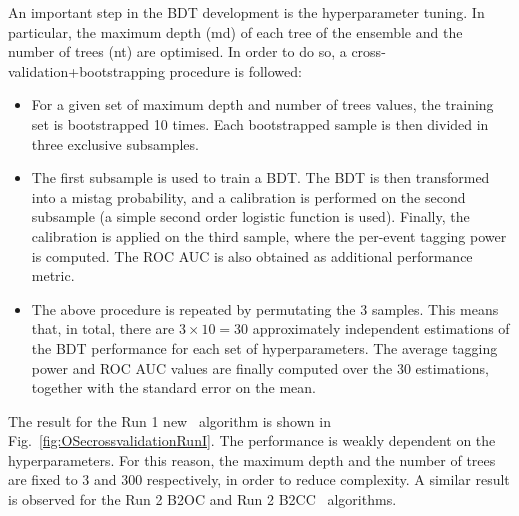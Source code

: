 An important step in the BDT development is the hyperparameter tuning. In particular, the maximum depth (md) of each tree of the ensemble and the number of trees (nt) are optimised. In order to do so, a cross-validation+bootstrapping procedure is followed:
\begin{itemize}[noitemsep,topsep=0pt]
  \item For a given set of maximum depth and number of trees values, the training set is bootstrapped 10 times. Each bootstrapped sample is then divided in three exclusive subsamples.
  \item The first subsample is used to train a BDT. The BDT is then transformed into a mistag probability, and a calibration is performed on the second subsample (a simple second order logistic function is used). Finally, the calibration is applied on the third sample, where the per-event tagging power is computed. The ROC AUC is also obtained as additional performance metric.
  \item The above procedure is repeated by permutating the 3 samples. This means that, in total, there are $3\times10=30$ approximately independent estimations of the BDT performance for each set of hyperparameters. The average tagging power and ROC AUC values are finally computed over the 30 estimations, together with the standard error on the mean.   
\end{itemize}
The result for the Run 1 new \OSe~algorithm is shown in Fig.~\ref{fig:OSecrossvalidationRunI}. The performance is weakly dependent on the hyperparameters. For this reason, the maximum depth and the number of trees are fixed to 3 and 300 respectively, in order to reduce complexity. A similar result is observed for the Run 2 B2OC and Run 2 B2CC \OSe~algorithms.

